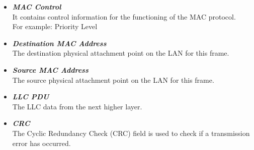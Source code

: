 \documentclass[12pt]{article}
\begin{document}
\begin{itemize}
    \item \textbf{\textit{MAC Control}} \\
        It contains control information for the functioning of the MAC protocol. \\
        For example: Priority Level
    \item \textbf{\textit{Destination MAC Address}} \\
        The destination physical attachment point on the LAN for this frame.
    \item \textbf{\textit{Source MAC Address}} \\
        The source physical attachment point on the LAN for this frame.
    \item \textbf{\textit{LLC PDU}} \\
        The LLC data from the next higher layer.
    \item \textbf{\textit{CRC}} \\
        The Cyclic Redundancy Check (CRC) field is used to check if a transmission error has occurred.
\end{itemize}

\end{document}
